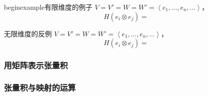 begin{example}{有限维度的例子}
$V = V' = W = W' = \left\langle e_1, \dots, e_n, \dots \right\rangle$，
\begin{equation}
H(e_i \otimes e_j) = ~
\end{equation}

\begin{example}{无限维度的反例}
$V = V' = W = W' = \left\langle e_1, \dots, e_n, \dots \right\rangle$，
\begin{equation}
H(e_i \otimes e_j) = ~
\end{equation}

\end{example}

\subsubsection{用矩阵表示张量积}


\subsubsection{张量积与映射的运算}










